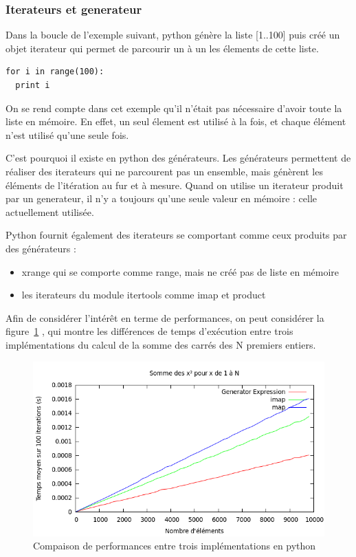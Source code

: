 \documentclass[a4paper]{article}
\begin{document}
\subsubsection{Iterateurs et generateur}

Dans la boucle de l'exemple suivant, python génère la liste  [1..100] puis créé un objet iterateur qui permet de parcourir un à un les élements de cette liste.

\begin{verbatim}
for i in range(100):
  print i
\end{verbatim}

On se rend compte dans cet exemple qu'il n'était pas nécessaire d'avoir toute la liste en mémoire. En effet, un seul élement est utilisé à la fois, et chaque élément n'est utilisé qu'une seule fois.

C'est pourquoi il existe en python des générateurs. Les générateurs permettent de réaliser des iterateurs qui ne parcourent pas un ensemble, mais génèrent les éléments de l'itération au fur et à mesure. Quand on utilise un iterateur produit par un generateur, il n'y a toujours qu'une seule valeur en mémoire : celle actuellement utilisée.

Python fournit également des iterateurs se comportant comme ceux produits par des générateurs : 

\begin{itemize}
  \item xrange qui se comporte comme range, mais ne créé pas de liste en mémoire
  \item les iterateurs du module itertools comme imap et product
\end{itemize}

Afin de considérer l'intérêt en terme de performances, on peut considérer la figure~\ref{GenExpMapImapPy} , qui montre les différences de temps d'exécution entre trois implémentations du calcul de la somme des carrés des N premiers entiers. 

\begin{figure}[h]
  \includegraphics[scale=0.5]{./Pictures/GenExpMapImapPy}
  \caption{Compaison de performances entre trois implémentations en python}
  \label{GenExpMapImapPy}
\end{figure}
\end{document}
